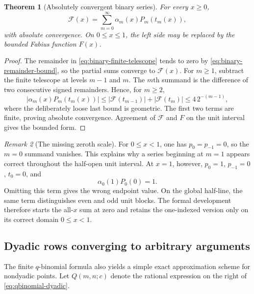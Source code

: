\documentclass[11pt]{article}
\numberwithin{equation}{section}
\newtheorem{theorem}{Theorem}[section]
\theoremstyle{definition}
\theoremstyle{remark}
\newtheorem{remark}[theorem]{Remark}
\newcommand{\GF}{\mathcal F}
\begin{document}
\begin{theorem}[Absolutely convergent binary series]\label{thm:binary-series}
For every $x\ge0$,
\begin{equation}\label{eq:binary-series}
\boxed{
 \GF(x)=\sum_{m=0}^{\infty}\alpha_m(x)P_m(t_m(x)),}
\end{equation}
with absolute convergence.  On $0\le x\le1$, the left side may be replaced
by the bounded Fabius function $F(x)$.
\end{theorem}

\begin{proof}
The remainder in \eqref{eq:binary-finite-telescope} tends to zero by
\eqref{eq:binary-remainder-bound}, so the partial sums converge to $\GF(x)$.
For $m\ge1$, subtract the finite telescope at levels $m-1$ and $m$.  The
$m$th summand is the difference of two consecutive signed remainders.  Hence,
for $m\ge2$,
\begin{equation}\label{eq:binary-summand-bound}
 |\alpha_m(x)P_m(t_m(x))|
 \le |\GF(t_{m-1})|+|\GF(t_m)|
 \le 4\,2^{-(m-1)},
\end{equation}
where the deliberately loose last bound is geometric.  The first two terms
are finite, proving absolute convergence.  Agreement of $\GF$ and $F$ on the
unit interval gives the bounded form.
\end{proof}

\begin{remark}[The missing zeroth scale]\label{rem:missing-zero-scale}
For $0\le x<1$, one has $p_0=p_{-1}=0$, so the $m=0$ summand vanishes.  This
explains why a series beginning at $m=1$ appears correct throughout the
half-open unit interval.  At $x=1$, however,
$p_0=1$, $p_{-1}=0$, $t_0=0$, and
\begin{equation}\label{eq:zero-scale-at-one}
 \alpha_0(1)P_0(0)=1.
\end{equation}
Omitting this term gives the wrong endpoint value.  On the global half-line,
the same term distinguishes even and odd unit blocks.  The formal development
therefore starts the all-$x$ sum at zero and retains the one-indexed version
only on its correct domain $0\le x<1$.
\end{remark}

\subsection{Dyadic rows converging to arbitrary arguments}

The finite $q$-binomial formula also yields a simple exact approximation
scheme for nondyadic points.  Let $Q(m,n;c)$ denote the rational expression on
the right of \eqref{eq:qbinomial-dyadic}.
\end{document}
